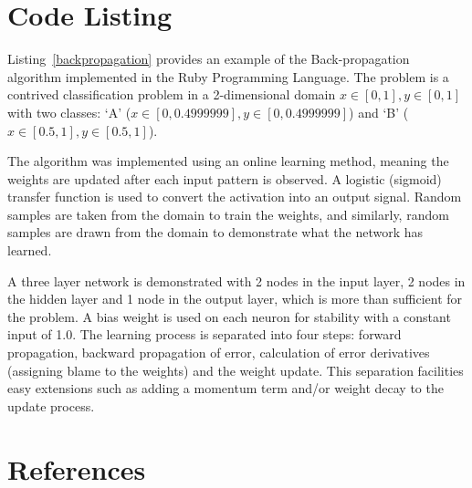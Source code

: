 \documentclass[a4paper, 11pt]{article}
\begin{document}
\section{Code Listing}
\label{sec:code}
Listing~\ref{backpropagation} provides an example of the Back-propagation algorithm implemented in the Ruby Programming Language. 
The problem is a contrived classification problem in a 2-dimensional domain $x\in[0,1], y\in[0,1]$ with two classes: `A' ($x\in[0,0.4999999], y\in[0,0.4999999]$) and `B' ($x\in[0.5,1], y\in[0.5,1]$).

The algorithm was implemented using an online learning method, meaning the weights are updated after each input pattern is observed. A logistic (sigmoid) transfer function is used to convert the activation into an output signal. Random samples are taken from the domain to train the weights, and similarly, random samples are drawn from the domain to demonstrate what the network has learned. 

A three layer network is demonstrated with 2 nodes in the input layer, 2 nodes in the hidden layer and 1 node in the output layer, which is more than sufficient for the problem. A bias weight is used on each neuron for stability with a constant input of 1.0. The learning process is separated into four steps: forward propagation, backward propagation of error, calculation of error derivatives (assigning blame to the weights) and the weight update. This separation facilities easy extensions such as adding a momentum term and/or weight decay to the update process.




\section{References}
\label{sec:references}
\end{document}
